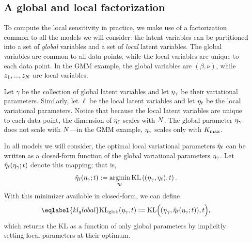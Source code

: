 \subsection{A global and local factorization}

To compute the local sensitivity in practice, we
make use of a factorization common to all the models we will consider:
the latent variables can be partitioned into a set of \textit{global}
variables and a set of \textit{local} latent variables.
The global variables are common to all data points, while the local variables
are unique to each data point.
In the GMM example, the global variables are $(\beta, \nu)$,
while $z_1, ..., z_N$ are local variables.

Let $\gamma$ be the collection of global latent variables
and let $\eta_{\gamma}$ be their variational parameters.
Similarly, let $\ell$ be the local latent variables and
let $\eta_{\ell}$ be the local variational parameters.
Notice that because the local latent variables are unique to each data point,
the dimension of $\eta_{\ell}$ scales with $N$.
The global parameter $\eta_{\gamma}$ does not scale with $N$---in the GMM example,
$\eta_{\gamma}$ scales only with ${K_{\mathrm{max}}}$.

In all models we will consider,
the optimal local variational parameters $\hat\eta_{\ell}$ can be written
as a closed-form function of the global variational parameters $\eta_{\gamma}$.
Let $\hat\eta_{\ell}(\eta_\gamma; t)$ denote this mapping; that is,
\begin{align*}
  \hat\eta_{\ell}(\eta_{\gamma}; t) := \operatorname*{\mathrm{argmin}}_{\eta_{\ell}} \mathrm{KL}\left((\eta_\gamma, \eta_{\ell}), t\right).
\end{align*}
With this minimizer available in closed-form, we can define
\begin{align}\eqlabel{kl_global}
\KLglobal(\eta_\gamma, \t) := \mathrm{KL}\Big((\eta_\gamma, \etaoptlocal(\eta_\gamma; \t)), \t\Big),
\end{align}
which returns the $\mathrm{KL}$ as a function of only global parameters
by implicitly setting local parameters at their optimum.

